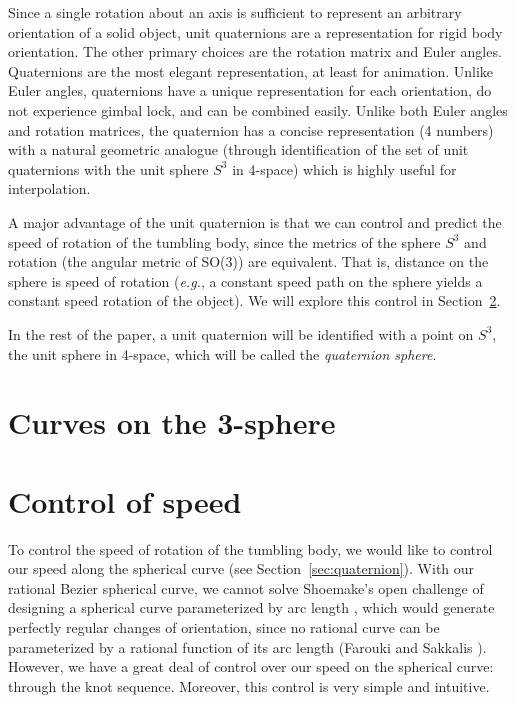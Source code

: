 Since a single rotation about an axis is sufficient
to represent an arbitrary orientation of a solid object,
unit quaternions are a representation for rigid body orientation.
The other primary choices are the rotation matrix and Euler angles.
Quaternions are the most elegant representation, at least for animation.
Unlike Euler angles, quaternions have a unique representation 
for each orientation, do not experience gimbal lock, and can be
combined easily.
Unlike both Euler angles and rotation matrices,
the quaternion has a concise representation (4 numbers) with a natural
geometric analogue (through identification of the set of unit quaternions 
with the unit sphere $S^3$ in 4-space) which is highly useful for interpolation.

A major advantage of the unit quaternion is that we can 
control and predict the speed of rotation of the tumbling body,
since the metrics of the sphere $S^3$ and rotation (the angular metric of
SO(3)) are equivalent.
That is, distance on the sphere is speed of rotation ({\em e.g.},
a constant speed path on the sphere yields a constant speed rotation
of the object).
We will explore this control in Section~\ref{sec:speed}.


In the rest of the paper, a unit quaternion will be identified
with a point on $S^3$, the unit sphere in 4-space, which will be
called the {\em quaternion sphere}.

\section{Curves on the 3-sphere}

\section{Control of speed}
\label{sec:speed}

To control the speed of rotation of the tumbling body,
we would like to control our speed along the spherical curve
(see Section~\ref{sec:quaternion}).
With our rational Bezier spherical curve, we cannot solve
Shoemake's open challenge of designing a spherical curve
parameterized by arc length \cite{shoemake85},
which would generate perfectly regular changes of orientation,
since no rational curve can be parameterized by a rational function
of its arc length (Farouki and Sakkalis \cite{farouki91}).
However, we have a great deal of control over our speed on the
spherical curve: through the knot sequence.
Moreover, this control is very simple and intuitive.

